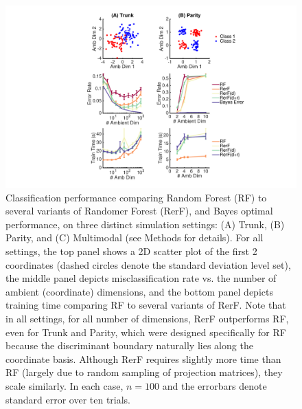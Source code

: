\documentclass{article} %
\begin{document}
\begin{figure}[h]
\begin{center}
\includegraphics[trim=0in 0in 0in 0in, clip=true, width=\linewidth]{../Figures/pdf/Fig1_Simulation}
\end{center}
\caption{Classification performance comparing Random Forest (RF) to several variants of Randomer Forest (RerF), and Bayes optimal performance, on three distinct simulation settings: (A) Trunk, (B) Parity, and (C) Multimodal (see Methods for details).  For all settings, the top panel shows a 2D scatter plot of the first 2 coordinates (dashed circles denote the standard deviation level set), the middle panel depicts misclassification rate vs. the number of ambient (coordinate) dimensions, and the bottom panel depicts training time comparing RF to several variants of RerF.  Note that in all settings, for all number of dimensions, RerF outperforms RF, even for Trunk and Parity, which were designed specifically for RF because the discriminant boundary naturally lies along the coordinate basis. Although RerF requires slightly more time than RF (largely due to random sampling of projection matrices), they scale similarly. In each case, $n=100$ and the errorbars denote standard error over ten trials.}
\label{fig:sim}
\end{figure}

\end{document}
